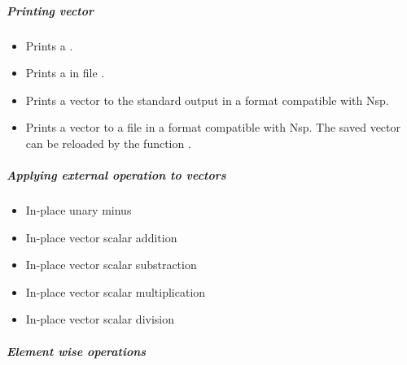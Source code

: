 \subparagraph{Printing vector}
\begin{itemize}
\item {}
  \sshortdescribe Prints a .  
\item {}
  \sshortdescribe Prints a  in file .  
\item {}
  \sshortdescribe Prints a vector to the standard output in a format
  compatible with Nsp.  
\item {}
  \sshortdescribe Prints a vector to a file in a format compatible with Nsp. The
  saved vector can be reloaded by the function
  .
\end{itemize}

\subparagraph{Applying external operation to vectors}

\begin{itemize}
\item {}
  \sshortdescribe In-place unary minus
\item {}
  \sshortdescribe In-place vector scalar addition  
\item {}
  \sshortdescribe In-place vector scalar substraction  
\item {}
  \sshortdescribe In-place vector scalar multiplication  
\item {}
  \sshortdescribe In-place vector scalar division  
\end{itemize}

\subparagraph{Element wise operations}

